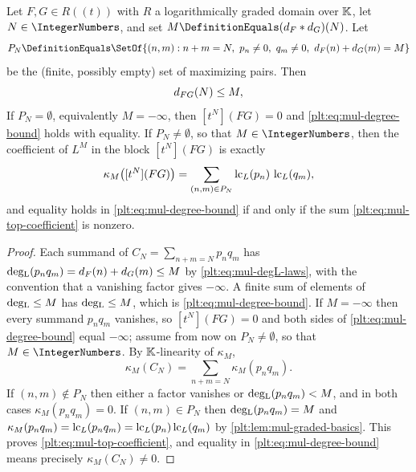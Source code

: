 \begin{theorem}
\label{plt:thm:mul-degree-bound}
Let $F,G\in R((t))$ with $R$ a logarithmically graded domain over $\mathbb{K}$, let
$N\in\IntegerNumbers$, and set
$M\DefinitionEquals(\dprofile{F}\ast\dprofile{G})(N)$.  Let
\[
 P_N\DefinitionEquals
 \SetOf{(n,m):n+m=N,\ p_n\ne0,\ q_m\ne0,\
        \dprofile{F}(n)+\dprofile{G}(m)=M}
\]
be the (finite, possibly empty) set of maximizing pairs.  Then
\begin{equation}\label{plt:eq:mul-degree-bound}
 d_{FG}(N)\le M,
\end{equation}
If $P_N=\emptyset$, equivalently $M=-\infty$, then $[t^N](FG)=0$ and
\eqref{plt:eq:mul-degree-bound} holds with equality.  If $P_N\ne\emptyset$,
so that $M\in\IntegerNumbers$, then the coefficient of $L^{M}$ in the block
$[t^N](FG)$ is exactly
\begin{equation}\label{plt:eq:mul-top-coefficient}
 \kappa_{M}\bigl([t^N](FG)\bigr)
 =\sum_{(n,m)\in P_N}\operatorname{lc}_L(p_n)\,\operatorname{lc}_L(q_m),
\end{equation}
and equality holds in \eqref{plt:eq:mul-degree-bound} if and only if the
sum \eqref{plt:eq:mul-top-coefficient} is nonzero.
\end{theorem}

\begin{proof}
Each summand of $C_N=\sum_{n+m=N}p_nq_m$ has
$\operatorname{deg_{L}}(p_nq_m)=d_{F}(n)+d_{G}(m)\le M$ by
\eqref{plt:eq:mul-degL-laws}, with the convention that a vanishing factor
gives $-\infty$.  A finite sum of elements of $\operatorname{deg_{L}}\le M$ has
$\operatorname{deg_{L}}\le M$, which is \eqref{plt:eq:mul-degree-bound}.  If $M=-\infty$ then
every summand $p_nq_m$ vanishes, so $[t^N](FG)=0$ and both sides of
\eqref{plt:eq:mul-degree-bound} equal $-\infty$; assume from now on
$P_N\ne\emptyset$, so that $M\in\IntegerNumbers$.  By $\mathbb{K}$-linearity of
$\kappa_M$,
\[
 \kappa_M(C_N)=\sum_{n+m=N}\kappa_M(p_nq_m).
\]
If $(n,m)\notin P_N$ then either a factor vanishes or
$\operatorname{deg_{L}}(p_nq_m)<M$, and in both cases $\kappa_M(p_nq_m)=0$.  If
$(n,m)\in P_N$ then $\operatorname{deg_{L}}(p_nq_m)=M$ and
$\kappa_M(p_nq_m)=\operatorname{lc}_L(p_nq_m)=\operatorname{lc}_L(p_n)\operatorname{lc}_L(q_m)$ by
\cref{plt:lem:mul-graded-basics}.  This proves
\eqref{plt:eq:mul-top-coefficient}, and equality in
\eqref{plt:eq:mul-degree-bound} means precisely $\kappa_M(C_N)\ne0$.
\end{proof}

